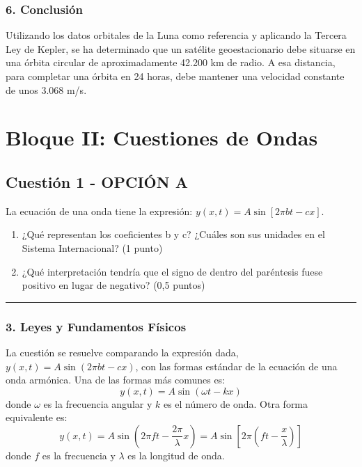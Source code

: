 \subsubsection*{6. Conclusión}
\begin{cajaconclusion}
Utilizando los datos orbitales de la Luna como referencia y aplicando la Tercera Ley de Kepler, se ha determinado que un satélite geoestacionario debe situarse en una órbita circular de aproximadamente 42.200 km de radio. A esa distancia, para completar una órbita en 24 horas, debe mantener una velocidad constante de unos 3.068 m/s.
\end{cajaconclusion}

\newpage

\section{Bloque II: Cuestiones de Ondas}
\label{sec:ondas_2007_jun_ord}

\subsection{Cuestión 1 - OPCIÓN A}
\label{subsec:2A_2007_jun_ord}

\begin{cajaenunciado}
La ecuación de una onda tiene la expresión: $y(x,t)=A \sin[2\pi bt - cx]$.
\begin{enumerate}
    \item ¿Qué representan los coeficientes b y c? ¿Cuáles son sus unidades en el Sistema Internacional? (1 punto)
    \item ¿Qué interpretación tendría que el signo de dentro del paréntesis fuese positivo en lugar de negativo? (0,5 puntos)
\end{enumerate}
\end{cajaenunciado}
\hrule

\subsubsection*{3. Leyes y Fundamentos Físicos}
La cuestión se resuelve comparando la expresión dada, $y(x,t) = A \sin(2\pi bt - cx)$, con las formas estándar de la ecuación de una onda armónica. Una de las formas más comunes es:
$$ y(x,t) = A \sin(\omega t - kx) $$
donde $\omega$ es la frecuencia angular y $k$ es el número de onda. Otra forma equivalente es:
$$ y(x,t) = A \sin\left(2\pi f t - \frac{2\pi}{\lambda}x\right) = A \sin\left[2\pi\left(ft - \frac{x}{\lambda}\right)\right] $$
donde $f$ es la frecuencia y $\lambda$ es la longitud de onda.

